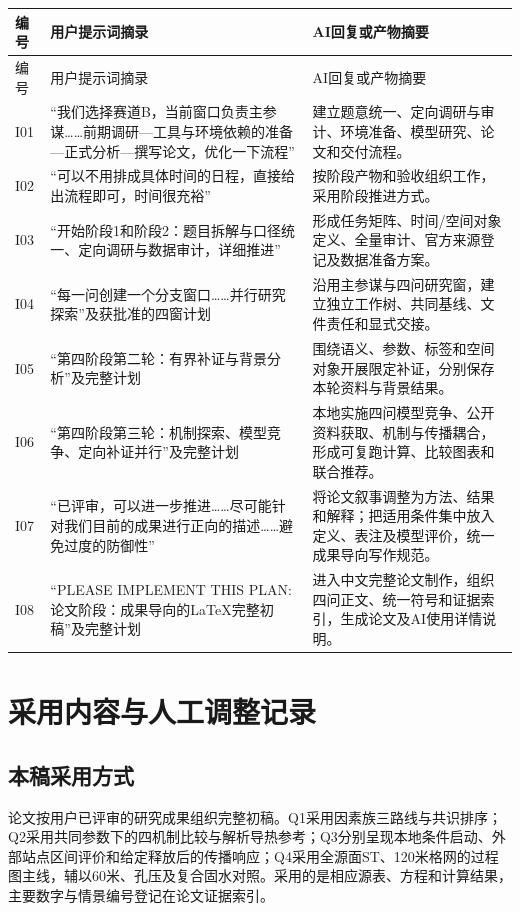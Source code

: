 \documentclass[UTF8,a4paper,zihao=-4,fontset=none]{ctexart}
\begin{document}
\begingroup\small
\begin{longtable}{p{1.1cm}p{5.3cm}p{7.2cm}}
\toprule 编号 & 用户提示词摘录 & AI回复或产物摘要 \\
\midrule\endfirsthead
\toprule 编号 & 用户提示词摘录 & AI回复或产物摘要 \\
\midrule\endhead
I01 & “我们选择赛道B，当前窗口负责主参谋……前期调研—工具与环境依赖的准备—正式分析—撰写论文，优化一下流程” & 建立题意统一、定向调研与审计、环境准备、模型研究、论文和交付流程。 \\
I02 & “可以不用排成具体时间的日程，直接给出流程即可，时间很充裕” & 按阶段产物和验收组织工作，采用阶段推进方式。 \\
I03 & “开始阶段1和阶段2：题目拆解与口径统一、定向调研与数据审计，详细推进” & 形成任务矩阵、时间/空间对象定义、全量审计、官方来源登记及数据准备方案。 \\
I04 & “每一问创建一个分支窗口……并行研究探索”及获批准的四窗计划 & 沿用主参谋与四问研究窗，建立独立工作树、共同基线、文件责任和显式交接。 \\
I05 & “第四阶段第二轮：有界补证与背景分析”及完整计划 & 围绕语义、参数、标签和空间对象开展限定补证，分别保存本轮资料与背景结果。 \\
I06 & “第四阶段第三轮：机制探索、模型竞争、定向补证并行”及完整计划 & 本地实施四问模型竞争、公开资料获取、机制与传播耦合，形成可复跑计算、比较图表和联合推荐。 \\
I07 & “已评审，可以进一步推进……尽可能针对我们目前的成果进行正向的描述……避免过度的防御性” & 将论文叙事调整为方法、结果和解释；把适用条件集中放入定义、表注及模型评价，统一成果导向写作规范。 \\
I08 & “PLEASE IMPLEMENT THIS PLAN: 论文阶段：成果导向的LaTeX完整初稿”及完整计划 & 进入中文完整论文制作，组织四问正文、统一符号和证据索引，生成论文及AI使用详情说明。 \\
\bottomrule
\end{longtable}
\endgroup

\section{采用内容与人工调整记录}
\subsection{本稿采用方式}
论文按用户已评审的研究成果组织完整初稿。Q1采用因素族三路线与共识排序；Q2采用共同参数下的四机制比较与解析导热参考；Q3分别呈现本地条件启动、外部站点区间评价和给定释放后的传播响应；Q4采用全源面ST、120米格网的过程图主线，辅以60米、孔压及复合固水对照。采用的是相应源表、方程和计算结果，主要数字与情景编号登记在论文证据索引。
\end{document}
